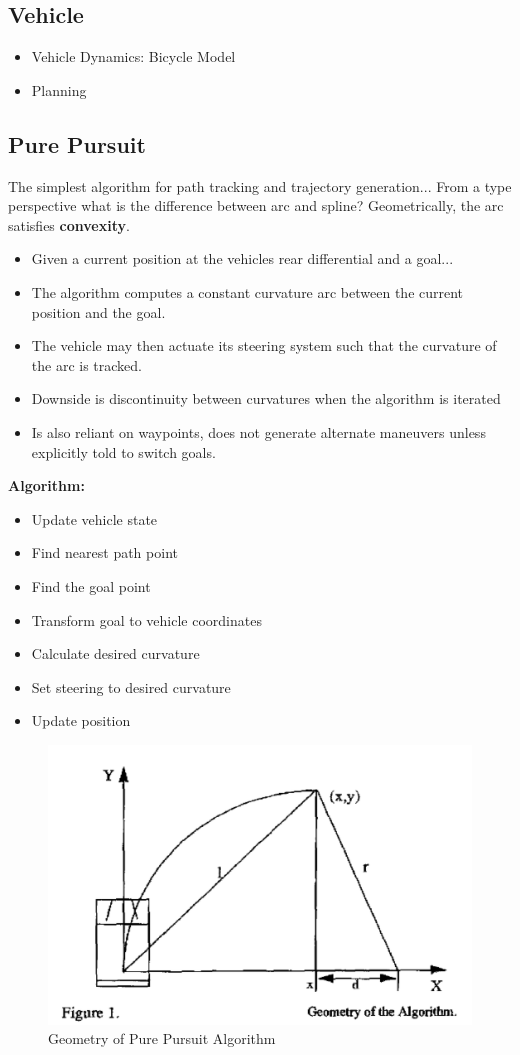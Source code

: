 \documentclass{easychair}
\begin{document}
\subsection{Vehicle}
\begin{itemize}
	\item Vehicle Dynamics: Bicycle Model
	\item Planning
\end{itemize}

\subsection{Pure Pursuit}
The simplest algorithm for path tracking and trajectory generation...
From a type perspective what is the difference between arc and spline? 
Geometrically, the arc satisfies \textbf{convexity}. 
\begin{itemize}
	\item Given a current position at the vehicles rear differential and a goal...
	\item The algorithm computes a constant curvature arc between the current position and the goal.
	\item The vehicle may then actuate its steering system such that the curvature of the arc is tracked.
	\item Downside is discontinuity between curvatures when the algorithm is iterated
	\item Is also reliant on waypoints, does not generate alternate maneuvers unless explicitly told to switch goals. 
\end{itemize}
\textbf{Algorithm:}
\begin{itemize}
	\item Update vehicle state
	\item Find nearest path point
	\item Find the goal point
	\item Transform goal to vehicle coordinates
	\item Calculate desired curvature
	\item Set steering to desired curvature
	\item Update position
\end{itemize}
\begin{figure}
	\centering
	\includegraphics[scale=.5]{figures/pure_pursuit_geom}
	\caption{Geometry of Pure Pursuit Algorithm}
\end{figure}
\end{document}
